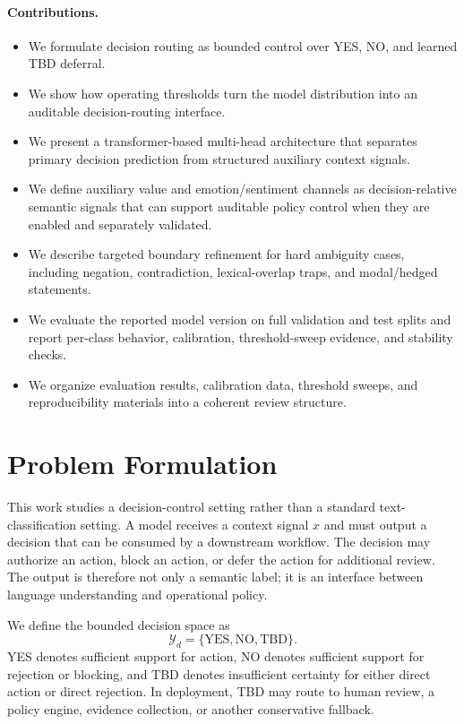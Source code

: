 \documentclass[11pt]{article}
\begin{document}
\paragraph{Contributions.}
\begin{itemize}[leftmargin=1.5em]
  \item We formulate decision routing as bounded control over YES, NO, and learned TBD deferral.
  \item We show how operating thresholds turn the model distribution into an auditable decision-routing interface.
  \item We present a transformer-based multi-head architecture that separates primary decision prediction from structured auxiliary context signals.
  \item We define auxiliary value and emotion/sentiment channels as decision-relative semantic signals that can support auditable policy control when they are enabled and separately validated.
  \item We describe targeted boundary refinement for hard ambiguity cases, including negation, contradiction, lexical-overlap traps, and modal/hedged statements.
  \item We evaluate the reported model version on full validation and test splits and report per-class behavior, calibration, threshold-sweep evidence, and stability checks.
  \item We organize evaluation results, calibration data, threshold sweeps, and reproducibility materials into a coherent review structure.
\end{itemize}

\section{Problem Formulation}

This work studies a decision-control setting rather than a standard text-classification setting. A model receives a context signal $x$ and must output a decision that can be consumed by a downstream workflow. The decision may authorize an action, block an action, or defer the action for additional review. The output is therefore not only a semantic label; it is an interface between language understanding and operational policy.

We define the bounded decision space as
\[
\mathcal{Y}_d = \{\text{YES}, \text{NO}, \text{TBD}\}.
\]
YES denotes sufficient support for action, NO denotes sufficient support for rejection or blocking, and TBD denotes insufficient certainty for either direct action or direct rejection. In deployment, TBD may route to human review, a policy engine, evidence collection, or another conservative fallback.
\end{document}
